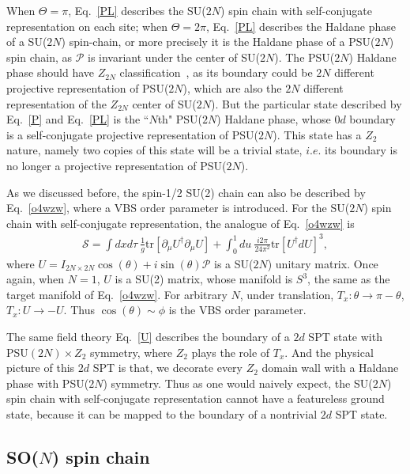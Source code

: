 \documentclass[aps,prb,twocolumn,superscriptaddress,showpacs]{revtex4}
\newcommand{\beqn}{\begin{eqnarray}}
\newcommand{\eeqn}{\end{eqnarray}}
\begin{document}
When $\Theta = \pi$, Eq.~\ref{PL} describes the SU($2N$) spin
chain with self-conjugate representation on each site; when
$\Theta = 2\pi$, Eq.~\ref{PL} describes the Haldane phase of a
SU($2N$) spin-chain, or more precisely it is the Haldane phase of
a PSU($2N$) spin chain, as $\mathcal{P}$ is invariant under the
center of SU($2N$). The PSU($2N$) Haldane phase should have
$Z_{2N}$ classification~\cite{psun}, as its boundary could be $2N$
different projective representation of PSU($2N$), which are also
the $2N$ different representation of the $Z_{2N}$ center of
SU($2N$). But the particular state described by Eq.~\ref{P} and
Eq.~\ref{PL} is the ``$N$th" PSU($2N$) Haldane phase, whose $0d$
boundary is a self-conjugate projective representation of
PSU($2N$). This state has a $Z_2$ nature, namely two copies of
this state will be a trivial state, $i.e.$ its boundary is no
longer a projective representation of PSU($2N$).

As we discussed before, the spin-1/2 SU(2) chain can also be
described by Eq.~\ref{o4wzw}, where a VBS order parameter is
introduced. For the SU($2N$) spin chain with self-conjugate
representation, the analogue of Eq.~\ref{o4wzw} is \beqn
\mathcal{S} = \int dx d\tau \ \frac{1}{g} \mathrm{tr}[\partial_\mu
U^\dagger
\partial_\mu U] + \int_0^1 du \ \frac{i2\pi}{ 24 \pi^2}  \mathrm{
tr}[ U^\dagger d U ]^3, \label{U} \eeqn where $U = I_{2N \times
2N}\cos(\theta) + i \sin(\theta) \mathcal{P}$ is a SU($2N$)
unitary matrix. Once again, when $N = 1$, $U$ is a SU(2) matrix,
whose manifold is $S^3$, the same as the target manifold of
Eq.~\ref{o4wzw}. For arbitrary $N$, under translation, $T_x:
\theta \rightarrow \pi - \theta$, $T_x: U \rightarrow - U$. Thus
$\cos(\theta) \sim \phi$ is the VBS order parameter.

The same field theory Eq.~\ref{U} describes the boundary of a $2d$
SPT state with PSU$(2N) \times Z_2$ symmetry, where $Z_2$ plays
the role of $T_x$. And the physical picture of this $2d$ SPT is
that, we decorate every $Z_2$ domain wall with a Haldane phase
with PSU($2N$) symmetry. Thus as one would naively expect, the
SU($2N$) spin chain with self-conjugate representation cannot have
a featureless ground state, because it can be mapped to the
boundary of a nontrivial $2d$ SPT state.

\subsection{SO($N$) spin chain}
\end{document}
